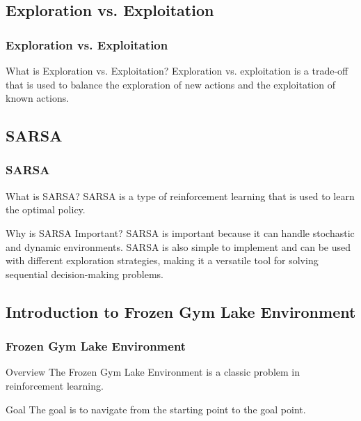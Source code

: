 \documentclass[aspectratio=169, hideothersubsections]{beamer}
\begin{document}
\subsection{Exploration vs. Exploitation}

\begin{frame}
  \frametitle{Exploration vs. Exploitation}
  \begin{block}{What is Exploration vs. Exploitation?}
    Exploration vs. exploitation is a trade-off that is used to balance the exploration of new actions and the exploitation of known actions.
  \end{block}
\end{frame}

\subsection{SARSA}

\begin{frame}
  \frametitle{SARSA}
  \begin{block}{What is SARSA?}
    SARSA is a type of reinforcement learning that is used to learn the optimal policy.
  \end{block}
  \begin{block}{Why is SARSA Important?}
    SARSA is important because it can handle stochastic and dynamic environments. SARSA is also simple to implement and can be used with different exploration strategies, making it a versatile tool for solving sequential decision-making problems.
  \end{block}
\end{frame}

\subsection{Introduction to Frozen Gym Lake Environment}
\begin{frame}
    \frametitle{Frozen Gym Lake Environment}
    \begin{block}{Overview}
        The Frozen Gym Lake Environment is a classic problem in reinforcement learning.
    \end{block}
    \begin{block}{Goal}
        The goal is to navigate from the starting point to the goal point.
    \end{block}
\end{frame}
\end{document}
